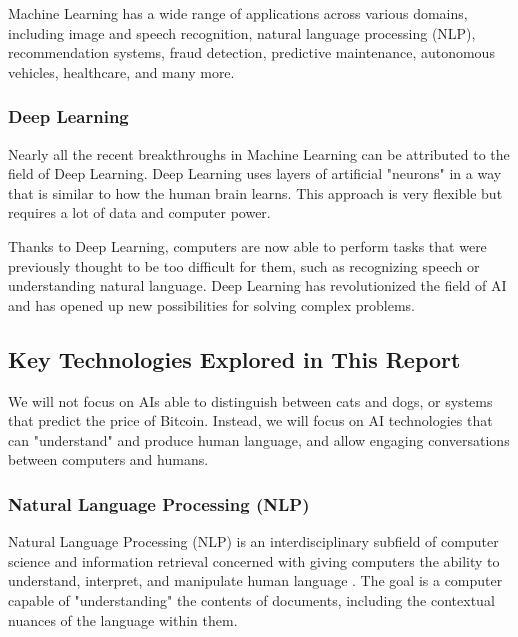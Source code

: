\documentclass{article}
\begin{document}
Machine Learning has a wide range of applications across various
domains, including image and speech recognition, natural language
processing (NLP), recommendation systems, fraud detection, predictive
maintenance, autonomous vehicles, healthcare, and many more.

\subsubsection{Deep Learning}

Nearly all the recent breakthroughs in Machine Learning can be attributed
to the field of Deep Learning. Deep Learning uses layers of artificial
"neurons" in a way that is similar to how the human brain learns.
This approach is very flexible but requires a lot of data and computer
power.

Thanks to Deep Learning, computers are now able to perform tasks that
were previously thought to be too difficult for them, such as recognizing
speech or understanding natural language. Deep Learning has revolutionized
the field of AI and has opened up new possibilities for solving complex
problems.


\subsection{Key Technologies Explored in This Report}

We will not focus on AIs able to distinguish between cats and dogs, or systems that predict the price of Bitcoin. Instead, we will focus on AI technologies that can "understand" and produce human language, and allow engaging conversations between computers and humans.


\subsubsection{Natural Language Processing (NLP)}

Natural Language Processing (NLP) is an interdisciplinary subfield
of computer science and information retrieval concerned with giving
computers the ability to understand, interpret, and manipulate human
language . The goal is a computer capable of "understanding"
the contents of documents, including the contextual nuances of the
language within them.
\end{document}
